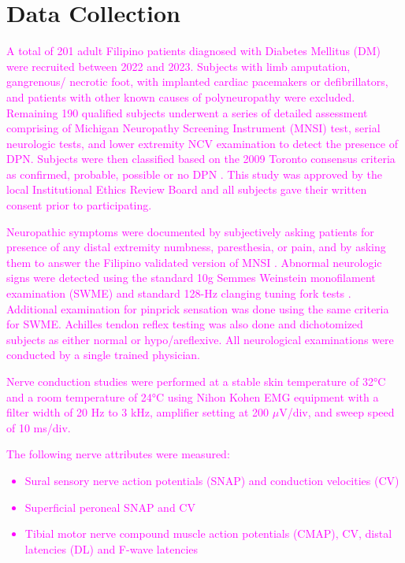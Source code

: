 \documentclass[fleqn,10pt]{wlscirep}
\begin{document}
\section*{Data Collection}
\textcolor{magenta}{
A total of 201 adult Filipino patients diagnosed with Diabetes Mellitus (DM) were recruited
between 2022 and 2023. Subjects with limb amputation, gangrenous/ necrotic foot, with implanted
cardiac pacemakers or defibrillators, and patients with other known causes of polyneuropathy were
excluded. Remaining 190 qualified subjects underwent a series of detailed assessment comprising of
Michigan Neuropathy Screening Instrument (MNSI) test, serial neurologic tests, and lower extremity NCV
examination to detect the presence of DPN. Subjects were then classified based on the 2009 Toronto
consensus criteria as confirmed, probable, possible or no DPN \cite{tesfaye2010diabetic}. This study was approved by the local Institutional Ethics Review Board and all subjects gave their written consent prior to participating.
}

\textcolor{magenta}{
Neuropathic symptoms were documented by subjectively asking patients for presence of any
distal extremity numbness, paresthesia, or pain, and by asking them to answer the Filipino validated
version of MNSI \cite{dagang2016validation}. Abnormal neurologic signs were detected using the standard 10g Semmes Weinstein monofilament examination (SWME) and standard 128-Hz clanging tuning fork tests \cite{feng2009semmes,oyer2007quantitative}. Additional examination for pinprick sensation was done using the same criteria for SWME. Achilles tendon reflex testing was also done and dichotomized subjects as either normal or hypo/areflexive. All neurological examinations were conducted by a single trained physician.
}

\textcolor{magenta}{
Nerve conduction studies were performed at a stable skin temperature of 32°C and a room
temperature of 24°C using Nihon Kohen EMG equipment with a filter width of 20 Hz to 3 kHz, amplifier
setting at 200 $\mu$V/div, and sweep speed of 10 ms/div. 
}

\textcolor{magenta}{
The following nerve attributes were measured: 
\begin{itemize}
\itemsep0em 
\item Sural sensory nerve action potentials (SNAP) and conduction velocities (CV)
\item Superficial peroneal SNAP and CV
\item Tibial motor nerve compound muscle action potentials (CMAP), CV, distal latencies (DL) and
F-wave latencies
\end{itemize}
}
\end{document}
